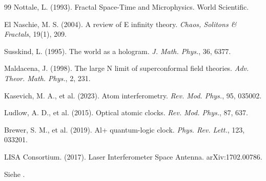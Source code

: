 \begin{thebibliography}{99}
		Nottale, L. (1993). Fractal Space-Time and Microphysics. World Scientific.
		
		El Naschie, M. S. (2004). A review of E infinity theory. \emph{Chaos, Solitons \& Fractals}, 19(1), 209.
		
		Susskind, L. (1995). The world as a hologram. \emph{J. Math. Phys.}, 36, 6377.
		
		Maldacena, J. (1998). The large N limit of superconformal field theories. \emph{Adv. Theor. Math. Phys.}, 2, 231.
		
		Kasevich, M. A., et al. (2023). Atom interferometry. \emph{Rev. Mod. Phys.}, 95, 035002.
		
		Ludlow, A. D., et al. (2015). Optical atomic clocks. \emph{Rev. Mod. Phys.}, 87, 637.
		
		Brewer, S. M., et al. (2019). Al+ quantum-logic clock. \emph{Phys. Rev. Lett.}, 123, 033201.
		
		LISA Consortium. (2017). Laser Interferometer Space Antenna. arXiv:1702.00786.
		
		Siehe \cite{hundert1931}.
		
	\end{thebibliography}
